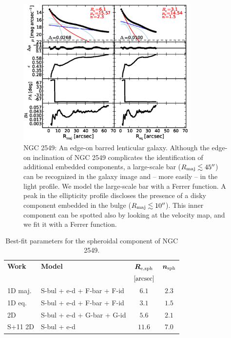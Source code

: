 \documentclass[preprint2]{emulateapj}
\newcommand{\fitfigurewidth}{0.8\textwidth}
\begin{document}
  \begin{figure}[h]
  \begin{center}
  \includegraphics[width=\fitfigurewidth]{images/n2549_1Dfit.eps}
  \caption{NGC 2549: 
  An edge-on barred lenticular galaxy. 
  Although the edge-on inclination of NGC 2549 complicates the identification of additional embedded components, 
  a large-scale bar ($R_{\rm maj} \lesssim 45''$) can be recognized in the galaxy image and -- more easily -- in the light profile.
  We model the large-scale bar with a Ferrer function.
  A peak in the ellipticity profile discloses the presence of a disky component
  embedded in the bulge ($R_{\rm maj} \lesssim 10''$).
  This inner component can be spotted also by looking at the velocity map, and 
  we fit it with a Ferrer function.
  }
  \end{center}
  \end{figure}

  \begin{table}[h]
  \small
  \caption{Best-fit parameters for the spheroidal component of NGC 2549.}
  \begin{center}
  \begin{tabular}{llcc}
  \hline
  {\bf Work} & {\bf Model}   & $\bm R_{\rm e,sph}$    & $\bm n_{\rm sph}$ \\
    &  &  $[\rm arcsec]$ & \\
  \hline
  1D maj. & S-bul + e-d + F-bar + F-id & $6.1$  &  $2.3$ \\
  1D eq.  & S-bul + e-d + F-bar + F-id & $3.1$  &  $1.5$ \\
  2D      & S-bul + e-d + G-bar + G-id & $5.6$  &  $2.1$ \\
  \hline
  S+11 2D         & S-bul + e-d & $11.6$  &  $7.0$ \\
  \hline
  \end{tabular}
  \end{center}
  \label{tab:n2549}
  \end{table}
\end{document}
